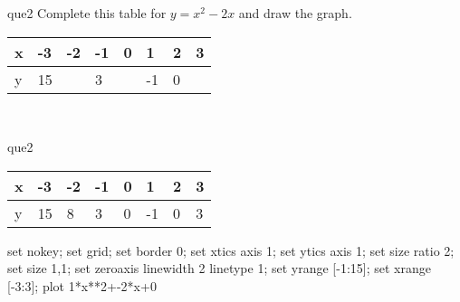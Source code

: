 \documentclass[13.5pt, varwidth=true]{beamer}
\begin{document}
\begin{frame}[shrink=19,fragile]
	\begin{beamercolorbox}[rounded=true, left, shadow=true,wd=14.8cm]{que2}
		 Complete this table for $y = x^{2} - 2x$ and draw the graph. \\[0.3cm] \renewcommand{\arraystretch}{1.2}\begin{tabular}{|C|C|C|C|C|C|C|C|} \hline x & -3 & -2 & -1 & 0 & 1 & 2 & 3 \\ \hline y & 15 &  & 3 &  & -1 & 0 & \\ \hline \end{tabular}\\[0.3cm]
	\end{beamercolorbox}
\end{frame}
\begin{frame}[shrink=19,fragile]
	\begin{beamercolorbox}[rounded=true, left, shadow=true,wd=14.8cm]{que2}
		\renewcommand{\arraystretch}{1.2}\begin{tabular}{|C|C|C|C|C|C|C|C|} \hline x & -3 & -2 & -1 & 0 & 1 & 2 & 3 \\ \hline y & 15 & 8 & 3 & 0 & -1 & 0 & 3\\ \hline \end{tabular}\begin{gnuplot}[terminal=pdf] set nokey; set grid; set border 0; set xtics axis 1; set ytics axis 1; set size ratio 2; set size 1,1; set zeroaxis linewidth 2 linetype 1; set yrange [-1:15]; set xrange [-3:3]; plot 1*x**2+-2*x+0 \end{gnuplot}
	\end{beamercolorbox}
\end{frame}
\end{document}
